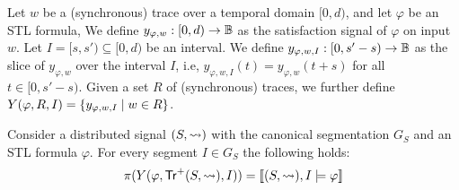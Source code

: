 Let $w$ be a (synchronous) trace over a temporal domain $[0,d)$, and let $\varphi$ be an STL formula,
We define $y_{\varphi,w} : [0,d) \to \mathbb{B}$ as the satisfaction signal of $\varphi$ on input $w$.
Let $I = [s, s') \subseteq [0,d)$ be an interval.
We define $y_{\varphi,w,I} : [0, s' - s) \to \mathbb{B}$ as the slice of $y_{\varphi,w}$ over the interval $I$, i.e, $y_{\varphi,w,I}(t) = y_{\varphi,w}(t + s)$ for all $t \in [0, s' - s)$.
Given a set  $R$ of (synchronous) traces, we further define $Y(\varphi, R, I) = \{ y_{\varphi,w,I} \st w \in R \}$.

\begin{lemma} \label{cl:eq}
	Consider a distributed signal $(S,{\rightsquigarrow})$ with the canonical segmentation $G_S$ and an STL formula $\varphi$.
	For every segment $I \in G_S$ the following holds:
	\[ \pi(Y(\varphi, \mathsf{Tr}^+(S,{\rightsquigarrow}), I)) = \llbracket (S,{\rightsquigarrow}), I \models \varphi \rrbracket \]
\end{lemma}
